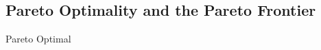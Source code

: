 \subsection{Pareto Optimality and the Pareto Frontier}
%
%
\begin{definition}{Pareto Optimal}
\[
\begin{aligned}
\end{aligned}
\]
\end{definition}
%
%
